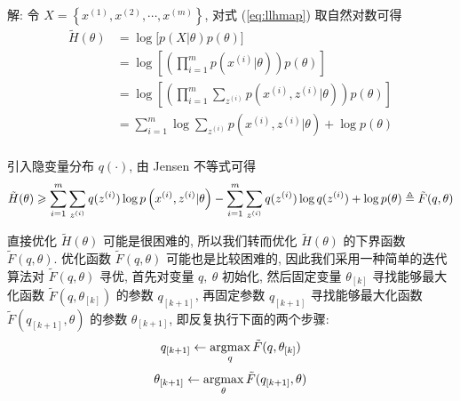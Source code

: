 \documentclass{article}
\begin{document}
解: 令 $X=\left\{x^{(1)},x^{(2)},\cdots,x^{(m)}\right\}$, 对式 (\ref{eq:llhmap}) 取自然对数可得
\begin{equation}
  \begin{aligned}
    \tilde{H}(\theta)
    &=\log\big[p(X|\theta)p(\theta)\big]\\
    &=\log\left[\left(\prod_{i = 1}^mp(x^{(i)}|\theta)\right)p(\theta)\right]\\
    &=\log\left[\left(\prod_{i = 1}^m \sum_{z^{(i)}}p(x^{(i)},z^{(i)}|\theta)\right)p(\theta)\right]\\
    &=\sum_{i=1}^m\log\sum_{z^{(i)}}p\left(x^{(i)},z^{(i)}|\theta\right)+\log p(\theta)\\
  \end{aligned}
\end{equation}

引入隐变量分布 $q(\cdot)$, 由 Jensen 不等式可得
\begin{equation}
  \tilde{H}(\theta)
  \geqslant\sum_{i=1}^m\sum_{z^{(i)}}q(z^{(i)})\log p\left(x^{(i)},z^{(i)}|\theta\right)-\sum_{i=1}^m\sum_{z^{(i)}}q(z^{(i)})\log q(z^{(i)})+\log p(\theta)
  \triangleq \tilde{F}(q,\theta)
\end{equation}

直接优化 $\tilde{H}(\theta)$ 可能是很困难的, 所以我们转而优化 $\tilde{H}(\theta)$ 的下界函数 $\tilde{F}(q,\theta)$. 优化函数 $\tilde{F}(q,\theta)$ 可能也是比较困难的, 因此我们采用一种简单的迭代算法对 $\tilde{F}(q,\theta)$ 寻优, 首先对变量 $q,~\theta$ 初始化, 然后固定变量 $\theta_{[k]}$ 寻找能够最大化函数 $\tilde{F}(q,\theta_{[k]})$ 的参数 $q_{[k+1]}$, 再固定参数 $q_{[k+1]}$ 寻找能够最大化函数 $\tilde{F}(q_{[k+1]},\theta)$ 的参数 $\theta_{[k+1]}$, 即反复执行下面的两个步骤:
\begin{equation}
  q_{[k+1]}\leftarrow\operatorname*{argmax}_{q}\tilde{F}(q,\theta_{[k]})
  \label{eq:estep}
\end{equation}
\begin{equation}
  \theta_{[k+1]}\leftarrow\operatorname*{argmax}_{\theta}\tilde{F}(q_{[k+1]},\theta)
\end{equation}
\end{document}
